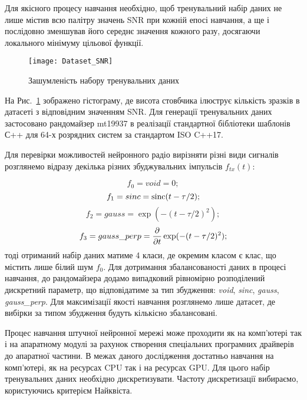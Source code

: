 Для якісного процесу навчання необхідно, щоб тренувальний набір даних не 
лише містив всю палітру значень SNR при кожній епосі навчання, а ще і 
послідовно зменшував його середнє значення кожного разу, досягаючи 
локального мінімуму цільової функції.

\begin{figure}[htbp] \begin{center}
\texttt{[image: Dataset\_SNR]}
\caption{Зашумленість набору тренувальних даних} \label{fig:SNR}
\end{center} \end{figure}

На Рис.~\ref{fig:SNR} зображено гістограму, де висота стовбчика ілюструє 
кількість зразків в датасеті з відповідним значенням SNR. Для генерації 
тренувальних даних застосовано рандомайзер mt19937 в реалізації стандартної
бібліотеки шаблонів С++ для 64-х розрядних систем за стандартом ISO C++17.

Для перевірки можливостей нейронного радіо вирізняти різні види сигналів 
розглянемо відразу декілька різних збуджувальних імпульсів $ f_{tx} (t) $:

\begin{equation} \label{eq:type_void}
f_0 = void = 0;
\end{equation}
%
\begin{equation} \label{eq:type_sinc}
f_1 = sinc = \operatorname{sinc}(t-\tau/2);
\end{equation}
%
\begin{equation} \label{eq:type_gauss}
f_2 = gauss = \exp(- (t-\tau/2)^2 );
\end{equation}
%
\begin{equation} \label{eq:type_gauss_perp}
f_3 = gauss\_perp = \frac{\partial }{\partial t} \exp(- (t-\tau/2)^2 );
\end{equation}
%
тоді отриманий набір даних матиме 4 класи, де окремим класом є клас, що 
містить лише білий шум $ f_0 $. Для дотримання збалансованості даних в 
процесі навчання, до рандомайзера додамо випадковий рівномірно розподілений 
дискретний параметр, що відповідатиме за тип збудження: \textit{void}, 
\textit{sinc}, \textit{gauss}, \textit{gauss\_perp}. Для максимізації 
якості навчання розглянемо лише датасет, де вибірки за типом збудження 
будуть кількісно збалансовані. 

Процес навчання штучної нейронної мережі може проходити як на комп'ютері так 
і на апаратному модулі за рахунок створення спеціальних програмних драйверів
до апаратної частини. В межах даного дослідження достатньо навчання на 
комп'ютері, як на ресурсах CPU так і на ресурсах GPU. Для цього набір 
тренувальних даних необхідно дискретизувати. Частоту дискретизації 
вибираємо, користуючись критерієм Найквіста.

